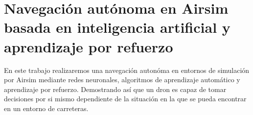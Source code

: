 \newpage
\section{Navegación autónoma en Airsim basada en inteligencia artificial y aprendizaje por refuerzo}
\label{sec:Navegación autónoma}

En este trabajo realizaremos una navegación autonóma en entornos de simulación por Airsim mediante redes neuronales, algoritmos de aprendizaje automático y aprendizaje 
por refuerzo. Demostrando así que un dron es capaz de tomar decisiones por si mismo dependiente de la situación en la que se pueda encontrar en un entorno de carreteras.

